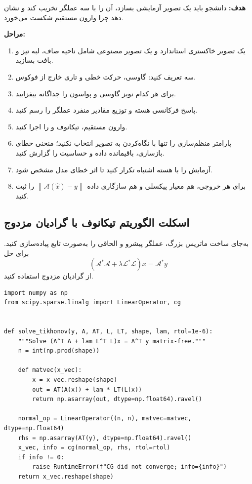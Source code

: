 \documentclass[12pt,openany,oneside]{book}
\newcommand{\norm}[1]{\left\lVert #1\right\rVert}
\newcommand{\op}[1]{\mathcal{#1}}
\begin{document}
\begin{workshopbox}
\textbf{هدف:} دانشجو باید یک تصویر آزمایشی بسازد، آن را با سه عملگر تخریب کند و نشان دهد چرا وارون مستقیم شکست می‌خورد.

\textbf{مراحل:}
\begin{enumerate}
\item یک تصویر خاکستری استاندارد و یک تصویر مصنوعی شامل ناحیه صاف، لبه تیز و بافت بسازید.
\item سه  تعریف کنید: گاوسی، حرکت خطی و تاری خارج از فوکوس.
\item برای هر کدام نویز گاوسی و پواسون را جداگانه بیفزایید.
\item پاسخ فرکانسی هسته و توزیع مقادیر منفرد عملگر را رسم کنید.
\item وارون مستقیم، تیکانوف و  را اجرا کنید.
\item پارامتر منظم‌سازی را تنها با نگاه‌کردن به تصویر انتخاب نکنید؛ منحنی خطای بازسازی، باقیمانده داده و حساسیت را گزارش کنید.
\item آزمایش را با هسته اشتباه تکرار کنید تا اثر خطای مدل مشخص شود.
\item برای هر خروجی، هم معیار پیکسلی و هم سازگاری داده \(\norm{\op A(\widehat x)-y}\) را ثبت کنید.
\end{enumerate}
\end{workshopbox}

\subsection{اسکلت الگوریتم تیکانوف با گرادیان مزدوج}

به‌جای ساخت ماتریس بزرگ، عملگر پیشرو و الحاقی را به‌صورت تابع پیاده‌سازی کنید.
برای حل
\begin{equation}
(\op A^*\op A+\lambda\op L^*\op L)x=\op A^*y
\end{equation}
از گرادیان مزدوج استفاده کنید.

\begin{LTR}
\begin{lstlisting}[caption={Matrix-free Tikhonov solver skeleton}]
import numpy as np
from scipy.sparse.linalg import LinearOperator, cg


def solve_tikhonov(y, A, AT, L, LT, shape, lam, rtol=1e-6):
    """Solve (A^T A + lam L^T L)x = A^T y matrix-free."""
    n = int(np.prod(shape))

    def matvec(x_vec):
        x = x_vec.reshape(shape)
        out = AT(A(x)) + lam * LT(L(x))
        return np.asarray(out, dtype=np.float64).ravel()

    normal_op = LinearOperator((n, n), matvec=matvec, dtype=np.float64)
    rhs = np.asarray(AT(y), dtype=np.float64).ravel()
    x_vec, info = cg(normal_op, rhs, rtol=rtol)
    if info != 0:
        raise RuntimeError(f"CG did not converge; info={info}")
    return x_vec.reshape(shape)
\end{lstlisting}
\end{LTR}
\end{document}

